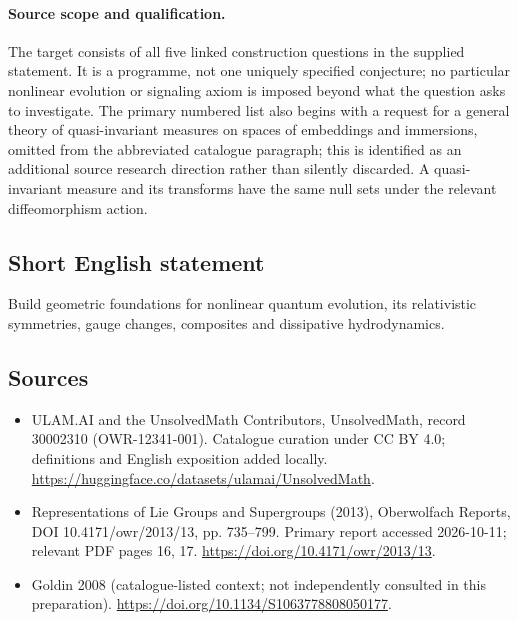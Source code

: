 \documentclass[11pt]{article}
\begin{document}
\paragraph{Source scope and qualification.}
The target consists of all five linked construction questions in the supplied statement. It is a programme, not one uniquely specified conjecture; no particular nonlinear evolution or signaling axiom is imposed beyond what the question asks to investigate. The primary numbered list also begins with a request for a general theory of quasi-invariant measures on spaces of embeddings and immersions, omitted from the abbreviated catalogue paragraph; this is identified as an additional source research direction rather than silently discarded. A quasi-invariant measure and its transforms have the same null sets under the relevant diffeomorphism action.
\subsection{Short English statement}
Build geometric foundations for nonlinear quantum evolution, its relativistic symmetries, gauge changes, composites and dissipative hydrodynamics.
\subsection{Sources}
\begin{itemize}
\item[\hypertarget{source:30002310:1}{S1}] ULAM.AI and the UnsolvedMath Contributors, UnsolvedMath, record 30002310 (OWR-12341-001). Catalogue curation under CC BY 4.0; definitions and English exposition added locally.
\url{https://huggingface.co/datasets/ulamai/UnsolvedMath}.
\item[\hypertarget{source:30002310:2}{S2}] Representations of Lie Groups and Supergroups (2013), Oberwolfach Reports, DOI 10.4171/owr/2013/13, pp. 735--799. Primary report accessed 2026-10-11; relevant PDF pages 16, 17.
\url{https://doi.org/10.4171/owr/2013/13}.
\item[\hypertarget{source:30002310:3}{S3}] Goldin 2008 (catalogue-listed context; not independently consulted in this preparation).
\url{https://doi.org/10.1134/S1063778808050177}.
\end{itemize}
\label{end:30002310}
\end{document}
